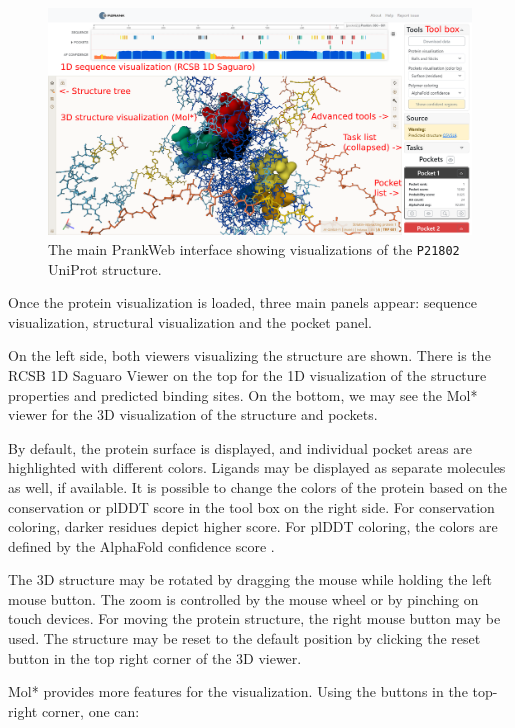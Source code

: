 \begin{figure}[ht]
    \centering
    \includegraphics[width=\textwidth]{img/pw_predict.png}
    \caption{The main PrankWeb interface showing visualizations of the \texttt{P21802} UniProt structure.}
    \label{fig:prankweb_viewers}
\end{figure}

Once the protein visualization is loaded, three main panels appear: sequence visualization, structural visualization and the pocket panel.

On the left side, both viewers visualizing the structure are shown. There is the RCSB 1D Saguaro Viewer on the top for the 1D visualization of the structure properties and predicted binding sites. On the bottom, we may see the Mol* viewer for the 3D visualization of the structure and pockets. 

By default, the protein surface is displayed, and individual pocket areas are highlighted with different colors. Ligands may be displayed as separate molecules as well, if available. It is possible to change the colors of the protein based on the conservation or plDDT score in the tool box on the right side. For conservation coloring, darker residues depict higher score. For plDDT coloring, the colors are defined by the AlphaFold confidence score \cite{david2022alphafold}.

The 3D structure may be rotated by dragging the mouse while holding the left mouse button. The zoom is controlled by the mouse wheel or by pinching on touch devices. For moving the protein structure, the right mouse button may be used. The structure may be reset to the default position by clicking the reset button in the top right corner of the 3D viewer.

Mol* provides more features for the visualization. Using the buttons in the top-right corner, one can:

